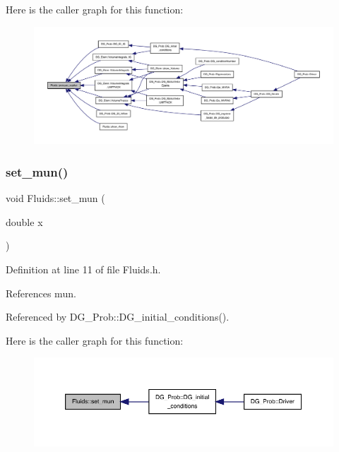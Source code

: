 Here is the caller graph for this function\+:
\nopagebreak
\begin{figure}[H]
\begin{center}
\leavevmode
\includegraphics[width=350pt]{classFluids_a26c1a1fba1aa34becddfbc4fb07692dd_icgraph}
\end{center}
\end{figure}
\mbox{\label{classFluids_a135ba7011914007d5cc82528d08595c4}} 
\subsubsection{\texorpdfstring{set\+\_\+mun()}{set\_mun()}}
{\footnotesize\ttfamily void Fluids\+::set\+\_\+mun (\begin{DoxyParamCaption}\item[{double}]{x }\end{DoxyParamCaption})\hspace{0.3cm}{\ttfamily [inline]}}



Definition at line 11 of file Fluids.\+h.



References mun.



Referenced by D\+G\+\_\+\+Prob\+::\+D\+G\+\_\+initial\+\_\+conditions().

Here is the caller graph for this function\+:
\nopagebreak
\begin{figure}[H]
\begin{center}
\leavevmode
\includegraphics[width=350pt]{classFluids_a135ba7011914007d5cc82528d08595c4_icgraph}
\end{center}
\end{figure}
\mbox{\label{classFluids_a55bdef7f5229ab62d2616d4617d5898c}} 
